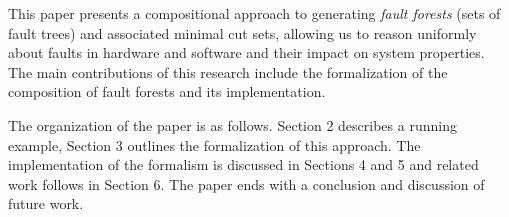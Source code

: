 
This paper presents a compositional approach to generating {\em fault forests} (sets of fault trees) and associated minimal cut sets, allowing us to reason uniformly about faults in hardware and software and their impact on system properties. The main contributions of this research include the formalization of the composition of fault forests and its implementation.


The organization of the paper is as follows.  Section 2 describes a running example, Section 3 outlines the formalization of this approach. The implementation of the formalism is discussed in Sections 4 and 5 and related work follows in Section 6. The paper ends with a conclusion and discussion of future work.
